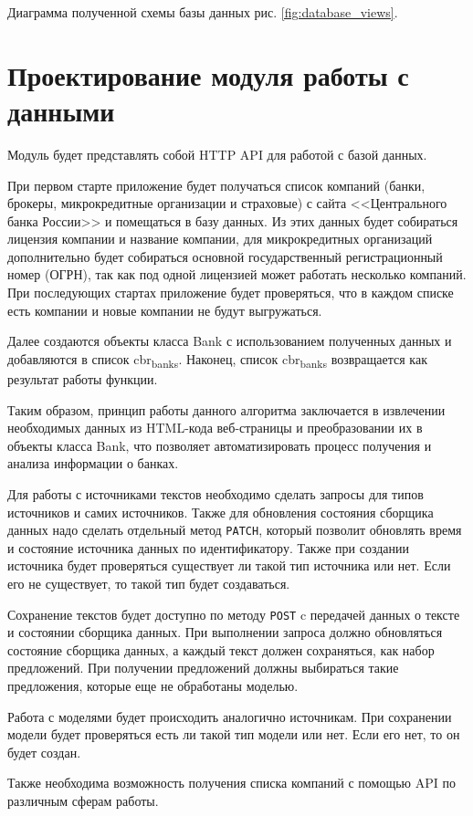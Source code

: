\documentclass[PI, VKR]{HSEUniversity}
\begin{document}
Диаграмма полученной схемы базы данных рис. \ref{fig:database_views}.
\section{Проектирование модуля работы с данными}
\label{sec:org2e878c9}
Модуль будет представлять собой HTTP API для работой с базой данных.

При первом старте приложение будет получаться список компаний (банки, брокеры, микрокредитные организации и страховые) с сайта {}<<Центрального банка России>>{} и помещаться в базу данных. Из этих данных будет собираться лицензия компании и название компании, для микрокредитных организаций дополнительно будет собираться основной государственный регистрационный номер (ОГРН), так как под одной лицензией может работать несколько компаний. При последующих стартах приложение будет проверяться, что в каждом списке есть компании и новые компании не будут выгружаться.

Далее создаются объекты класса Bank с использованием полученных данных и добавляются в список cbr\textsubscript{banks}. Наконец, список cbr\textsubscript{banks} возвращается как результат работы функции.

Таким образом, принцип работы данного алгоритма заключается в извлечении необходимых данных из HTML-кода веб-страницы и преобразовании их в объекты класса Bank, что позволяет автоматизировать процесс получения и анализа информации о банках.

Для работы с источниками текстов необходимо сделать запросы для типов источников и самих источников. Также для обновления состояния сборщика данных надо сделать отдельный метод \texttt{PATCH}, который позволит обновлять время и состояние источника данных по идентификатору. Также при создании источника будет проверяться существует ли такой тип источника или нет. Если его не существует, то такой тип будет создаваться.

Сохранение текстов будет доступно по методу \texttt{POST} c передачей данных о тексте и состоянии сборщика данных. При выполнении запроса должно обновляться состояние сборщика данных, а каждый текст должен сохраняться, как набор предложений. При получении предложений должны выбираться такие предложения, которые еще не обработаны моделью.

Работа с моделями будет происходить аналогично источникам. При сохранении модели будет проверяться есть ли такой тип модели или нет. Если его нет, то он будет создан.

Также необходима возможность получения списка компаний с помощью API по различным сферам работы.
\end{document}

